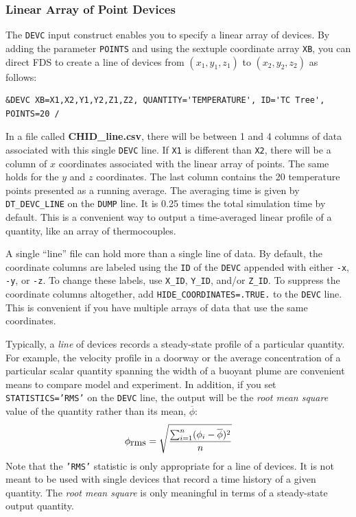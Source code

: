 \documentclass[11pt]{book}
\newcommand{\ct}{\tt\small}
\newcommand{\be}{\begin{equation}}
\newcommand{\ee}{\end{equation}}
\begin{document}
\subsubsection{Linear Array of Point Devices}
\label{info:line_file}

The {\ct DEVC} input construct enables you to specify a linear array of devices. By adding the parameter {\ct POINTS} and using the
sextuple coordinate array {\ct XB}, you can direct FDS to create a line of devices from $(x_1,y_1,z_1)$ to $(x_2,y_2,z_2)$ as follows:

\footnotesize
\begin{verbatim}
&DEVC XB=X1,X2,Y1,Y2,Z1,Z2, QUANTITY='TEMPERATURE', ID='TC Tree', POINTS=20 /
\end{verbatim}
\normalsize

\noindent
In a file called {\bf CHID\_line.csv}, there will be between 1 and 4 columns of data associated with this single {\ct DEVC} line. If {\ct X1} is
different than {\ct X2}, there will be a column of $x$ coordinates associated with the linear array of points. The same holds for the $y$ and
$z$ coordinates. The last column contains the 20 temperature points presented as a running average. The
averaging time is given by {\ct DT\_DEVC\_LINE} on the {\ct DUMP} line. It is 0.25 times the total simulation time by default. This is a convenient
way to output a time-averaged linear profile of a quantity, like an array of thermocouples.

A single ``line'' file can hold more than a single line of data. By default, the coordinate columns are labeled using the {\ct ID} of the {\ct DEVC} appended with
either {\ct -x}, {\ct -y}, or {\ct -z}. To change these labels, use {\ct X\_ID}, {\ct Y\_ID}, and/or {\ct Z\_ID}. To suppress the coordinate columns altogether, add
{\ct HIDE\_COORDINATES=.TRUE.} to the {\ct DEVC} line. This is convenient if you have multiple arrays of data that use the same coordinates.

Typically, a {\em line} of devices records a steady-state profile of a particular quantity. For example, the velocity profile in a doorway or the average concentration of
a particular scalar quantity spanning the width of a buoyant plume are convenient means to compare model and experiment. In addition, if you set
{\ct STATISTICS='RMS'} on the {\ct DEVC} line, the output will be the {\em root mean square} value of the quantity rather than its mean, $\overline{\phi}$:
\be
   \phi_{\hbox{rms}} = \sqrt{ \frac{ \sum_{i=1}^n (\phi_i - \overline{\phi})^2 }{n} }
\ee
Note that the {\ct 'RMS'} statistic is only appropriate for a line of devices. It is not meant to be used with single devices that record a time history of a given
quantity. The {\em root mean square} is only meaningful in terms of a steady-state output quantity.
\end{document}
